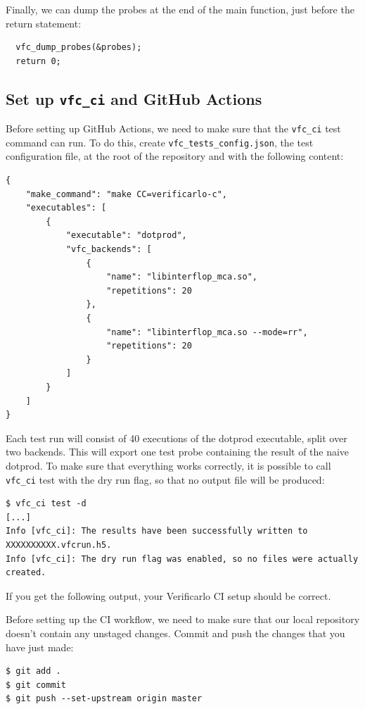 Finally, we can dump the probes at the end of the main function, just before the return statement:

\begin{verbatim}
  vfc_dump_probes(&probes);
  return 0;
\end{verbatim}


\subsection{Set up \texttt{vfc\_ci} and GitHub Actions}

Before setting up GitHub Actions, we need to make sure that the \texttt{vfc_ci} test command can run. To do this, create \texttt{vfc_tests_config.json}, the test configuration file, at the root of the repository and with the following content:

\begin{verbatim}
{
    "make_command": "make CC=verificarlo-c",
    "executables": [
        {
            "executable": "dotprod",
            "vfc_backends": [
                {
                    "name": "libinterflop_mca.so",
                    "repetitions": 20
                },
                {
                    "name": "libinterflop_mca.so --mode=rr",
                    "repetitions": 20
                }
            ]
        }
    ]
}
\end{verbatim}

Each test run will consist of 40 executions of the dotprod executable, split over two backends. This will export one test probe containing the result of the naive dotprod. To make sure that everything works correctly, it is possible to call \texttt{vfc_ci} test with the dry run flag, so that no output file will be produced:

\begin{verbatim}
$ vfc_ci test -d
[...]
Info [vfc_ci]: The results have been successfully written to XXXXXXXXXX.vfcrun.h5.
Info [vfc_ci]: The dry run flag was enabled, so no files were actually created.
\end{verbatim}

If you get the following output, your Verificarlo CI setup should be correct.

Before setting up the CI workflow, we need to make sure that our local repository doesn't contain any unstaged changes. Commit and push the changes that you have just made:

\begin{verbatim}
$ git add .
$ git commit
$ git push --set-upstream origin master
\end{verbatim}

